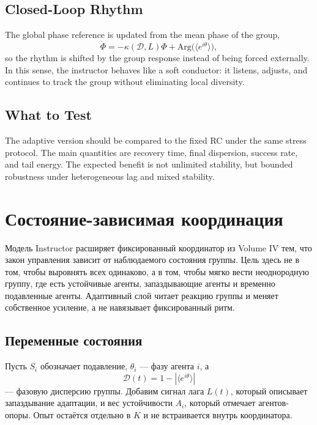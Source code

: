 \subsection{Closed-Loop Rhythm}
The global phase reference is updated from the mean phase of the group,
\begin{equation}
\dot{\Phi}=-\kappa(\mathcal{D},L)\Phi + \mathrm{Arg}\bigl(\langle e^{i\theta}\rangle\bigr),
\end{equation}
so the rhythm is shifted by the group response instead of being forced externally. In this sense, the instructor behaves like a soft conductor: it listens, adjusts, and continues to track the group without eliminating local diversity.

\subsection{What to Test}
The adaptive version should be compared to the fixed RC under the same stress protocol. The main quantities are recovery time, final dispersion, success rate, and tail energy. The expected benefit is not unlimited stability, but bounded robustness under heterogeneous lag and mixed stability.

\section{Состояние-зависимая координация}

Модель Instructor расширяет фиксированный координатор из Volume IV тем, что закон управления зависит от наблюдаемого состояния группы. Цель здесь не в том, чтобы выровнять всех одинаково, а в том, чтобы мягко вести неоднородную группу, где есть устойчивые агенты, запаздывающие агенты и временно подавленные агенты. Адаптивный слой читает реакцию группы и меняет собственное усиление, а не навязывает фиксированный ритм.

\subsection{Переменные состояния}
Пусть $S_i$ обозначает подавление, $\theta_i$ --- фазу агента $i$, а
\begin{equation}
\mathcal{D}(t)=1-\left|\langle e^{i\theta}\rangle\right|
\end{equation}
--- фазовую дисперсию группы. Добавим сигнал лага $L(t)$, который описывает запаздывание адаптации, и вес устойчивости $A_i$, который отмечает агентов-опоры. Опыт остаётся отдельно в $K$ и не встраивается внутрь координатора.

